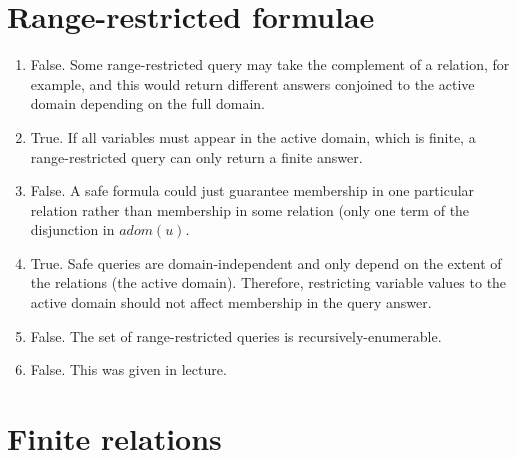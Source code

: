 \documentclass[12pt]{article}
\begin{document}
\section{Range-restricted formulae}

\begin{enumerate}
\item %
False. Some range-restricted query may take the complement of a relation,
for example, and this would return different answers conjoined to the
active domain depending on the full domain.

\item %
True. If all variables must appear in the active domain, which is finite,
a range-restricted query can only return a finite answer.
\item %
False. A safe formula could just guarantee membership in one particular
relation rather than membership in some relation (only one term of the
disjunction in $adom(u)$.

\item %
True. Safe queries are domain-independent and only depend on the extent of
the relations (the active domain). Therefore, restricting variable values to
the active domain should not affect membership in the query answer.
\item %
False. The set of range-restricted queries is recursively-enumerable.

\item %
False. This was given in lecture.

\end{enumerate}

\pagebreak

\section{Finite relations}
\end{document}
